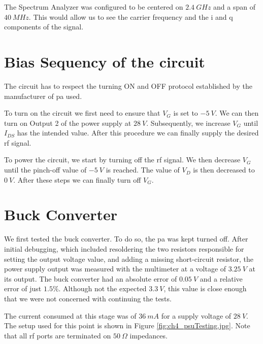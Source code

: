 \par The Spectrum Analyzer was configured to be centered on $2.4\:\si{GHz}$ and a span of $40\:\si{MHz}$. This would allow us to see the carrier frequency and the \ac{i} and \ac{q} components of the signal.

\section{Bias Sequency of the circuit}
\par The circuit has to respect the turning ON and OFF protocol established by the manufacturer of \ac{pa} used.

\par To turn on the circuit we first need to ensure that $V_{G}$ is set to $-5 \:\si{V}$. We can then turn on Output 2 of the power supply at $28\:\si{V}$. Subsequently, we increase $V_{G}$ until $I_{DS}$ has the intended value. After this procedure we can finally supply the desired \ac{rf} signal.

\par To power the circuit, we start by turning off the \ac{rf} signal. We then decrease $V_{G}$ until the pinch-off value of $-5\:\si{V}$ is reached. The value of $V_{D}$ is then decreased to $0\:\si{V}$. After these steps we can finally turn off $V_{G}$.

\section{Buck Converter}
\par We first tested the buck converter. To do so, the \ac{pa} was kept turned off. After initial debugging, which included resoldering the two resistors responsible for setting the output voltage value, and adding a missing short-circuit resistor, the power supply output was measured with the multimeter at a voltage of $3.25\:\si{V}$ at its output. The buck converter had an absolute error of $0.05\:\si{V}$ and a relative error of just  $1.5\%$. Although not the expected $3.3\:\si{V}$, this value is close enough that we were not concerned with continuing the tests.

\par The current consumed at this stage was of $36\:\si{mA}$ for a supply voltage of $28\:\si{V}$. The setup used for this point is shown in Figure \ref{fig:ch4_psuTesting.jpg}. Note that all \ac{rf} ports are terminated on $50\:\si{\Omega}$ impedances.

